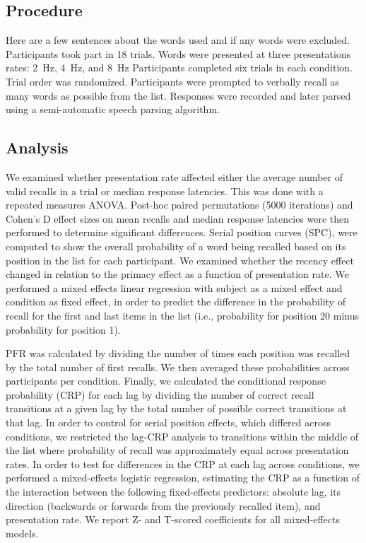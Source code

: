 \documentclass[10pt,letterpaper]{article}
\begin{document}
\subsection{Procedure}

Here are a few sentences about the words used and if any words were excluded.
Participants took part in 18 trials. Words were presented at three
presentations rates: 2~Hz, 4~Hz, and 8~Hz Participants completed six trials in
each condition. Trial order was randomized.  Participants were prompted to
verbally recall as many words as possible from the list. Responses were
recorded and later parsed using a semi-automatic speech parsing algorithm.

\subsection{Analysis}

We examined whether presentation rate affected either the average number of
valid recalls in a trial or median response latencies. This was done with a
repeated measures ANOVA. Post-hoc paired permutations (5000 iterations) and
Cohen's D effect sizes on mean recalls and median response latencies were then
performed to determine significant differences. Serial position curves (SPC),
were computed to show the overall probability of a word being recalled based
on its position in the list for each participant. We examined whether the recency
effect changed in relation to the primacy effect as a function of presentation
rate. We performed a mixed effects linear regression with subject as a mixed
effect and condition as fixed effect, in order to predict the difference in
the probability of recall for the first and last items in the list (i.e.,
probability for position 20 minus probability for position 1). 

PFR was calculated by dividing the number of times each position was recalled
by the total number of first recalls. We then averaged these probabilities
across participants per condition. Finally, we calculated the conditional
response probability (CRP) for each lag by dividing the number of correct
recall transitions at a given lag by the total number of possible correct
transitions at that lag. 
In order to control for serial position effects, which differed across
conditions, we restricted the lag-CRP analysis to transitions within the
middle of the list where probability of recall was approximately equal across
presentation rates.
In order to test for differences in the CRP at each
lag across conditions, we performed a mixed-effects logistic regression,
estimating the CRP as a function of the
interaction between the following fixed-effects predictors: absolute lag, its
direction (backwards or forwards from the previously recalled item), and 
presentation rate. We report Z- and T-scored coefficients for all
mixed-effects models.
\end{document}
